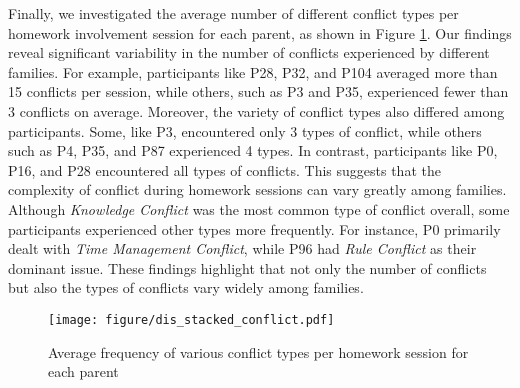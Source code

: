 Finally, we investigated the average number of different conflict types per homework involvement session for each parent, as shown in Figure \ref{fig:dis_stacked_conflict}. Our findings reveal significant variability in the number of conflicts experienced by different families. For example, participants like P28, P32, and P104 averaged more than 15 conflicts per session, while others, such as P3 and P35, experienced fewer than 3 conflicts on average. Moreover, the variety of conflict types also differed among participants. Some, like P3, encountered only 3 types of conflict, while others such as P4, P35, and P87 experienced 4 types. In contrast, participants like P0, P16, and P28 encountered all types of conflicts. This suggests that the complexity of conflict during homework sessions can vary greatly among families. Although \textit{Knowledge Conflict} was the most common type of conflict overall, some participants experienced other types more frequently. For instance, P0 primarily dealt with \textit{Time Management Conflict}, while P96 had \textit{Rule Conflict} as their dominant issue. These findings highlight that not only the number of conflicts but also the types of conflicts vary widely among families. 


\begin{figure}
    \centering
    \texttt{[image: figure/dis\_stacked\_conflict.pdf]}
    \caption{Average frequency of various conflict types per homework session for each parent}
    \label{fig:dis_stacked_conflict}
\end{figure}

